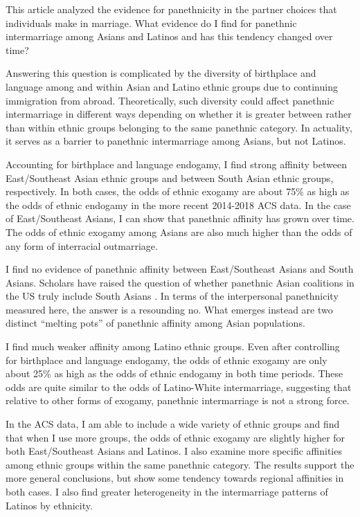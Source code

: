 \documentclass[11pt,]{article}
\begin{document}
This article analyzed the evidence for panethnicity in the partner choices that individuals make in marriage. What evidence do I find for panethnic intermarriage among Asians and Latinos and has this tendency changed over time?

Answering this question is complicated by the diversity of birthplace and language among and within Asian and Latino ethnic groups due to continuing immigration from abroad. Theoretically, such diversity could affect panethnic intermarriage in different ways depending on whether it is greater between rather than within ethnic groups belonging to the same panethnic category. In actuality, it serves as a barrier to panethnic intermarriage among Asians, but not Latinos.

Accounting for birthplace and language endogamy, I find strong affinity between East/Southeast Asian ethnic groups and between South Asian ethnic groups, respectively. In both cases, the odds of ethnic exogamy are about 75\% as high as the odds of ethnic endogamy in the more recent 2014-2018 ACS data. In the case of East/Southeast Asians, I can show that panethnic affinity has grown over time. The odds of ethnic exogamy among Asians are also much higher than the odds of any form of interracial outmarriage.

I find no evidence of panethnic affinity between East/Southeast Asians and South Asians. Scholars have raised the question of whether panethnic Asian coalitions in the US truly include South Asians \citep{kibria_not_1996}. In terms of the interpersonal panethnicity measured here, the answer is a resounding no. What emerges instead are two distinct ``melting pots'' of panethnic affinity among Asian populations.

I find much weaker affinity among Latino ethnic groups. Even after controlling for birthplace and language endogamy, the odds of ethnic exogamy are only about 25\% as high as the odds of ethnic endogamy in both time periods. These odds are quite similar to the odds of Latino-White intermarriage, suggesting that relative to other forms of exogamy, panethnic intermarriage is not a strong force.

In the ACS data, I am able to include a wide variety of ethnic groups and find that when I use more groups, the odds of ethnic exogamy are slightly higher for both East/Southeast Asians and Latinos. I also examine more specific affinities among ethnic groups within the same panethnic category. The results support the more general conclusions, but show some tendency towards regional affinities in both cases. I also find greater heterogeneity in the intermarriage patterns of Latinos by ethnicity.
\end{document}
